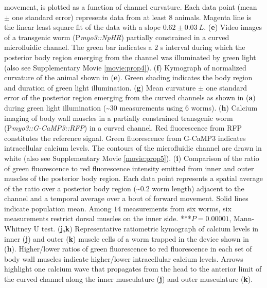 \begin{FPfigure}
{movement, is plotted as a function of channel curvature. Each data point (mean $\pm$ one standard 
error) represents data from at least 8 animals. Magenta line is the linear least square fit of the 
data with a slope $0.62 \pm 0.03~L$.  
(\textbf{e}) Video images of a transgenic worm (P\textit{myo3::NpHR}) partially constrained in a curved 
microfluidic channel. The green bar indicates a $2$ s interval during which the posterior body 
region emerging from the channel was illuminated by green light (also see Supplementary Movie  \ref{movie:prop4}). 
(\textbf{f}) Kymograph of normalized curvature of the animal shown in (\textbf{e}). Green shading indicates the 
body region and duration of green light illumination.  
(\textbf{g}) Mean curvature $\pm$ one standard error of the posterior region emerging from the curved 
channels as shown in (\textbf{a}) during green light illumination (\textasciitilde$30$ measurements using 6 worms). 
(\textbf{h}) Calcium imaging of body wall muscles in a partially constrained transgenic worm 
(P\textit{myo3::G-CaMP3::RFP}) in a curved channel. Red fluorescence from RFP constitutes the 
reference signal. Green fluorescence from G-CaMP3 indicates intracellular calcium levels. The 
contours of the microfluidic channel are drawn in white (also see Supplementary Movie  \ref{movie:prop5}). 
(\textbf{i}) Comparison of the ratio of green fluorescence to red fluorescence intensity emitted from inner 
and outer muscles of the posterior body region. Each data point represents a spatial average of 
the ratio over a posterior body region (\textasciitilde$0.2$ worm length) adjacent to the channel and a temporal 
average over a bout of forward movement. Solid lines indicate population mean. Among $14$ 
measurements from six worms, six measurements restrict dorsal muscles on the inner side. ***$P= 0.00001$, Mann-Whitney U test. 
(\textbf{j,k}) Representative ratiometric kymograph of calcium levels in inner (\textbf{j}) and outer (\textbf{k}) muscle 
cells of a worm trapped in the device shown in (\textbf{h}). Higher/lower ratios of green fluorescence to 
red fluorescence in each set of body wall muscles indicate higher/lower intracellular calcium 
levels. Arrows highlight one calcium wave that propagates from the head to the anterior limit of 
the curved channel along the inner musculature (\textbf{j}) and outer musculature (\textbf{k}).\label{fig:prop2}}
\end{FPfigure}


